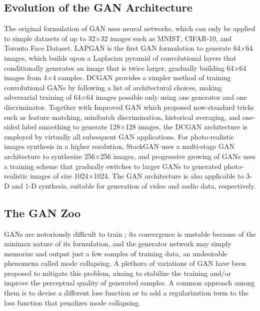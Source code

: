 \subsection{Evolution of the GAN Architecture}

The original formulation of GAN uses neural networks, which can only be applied to simple datasets of up to 32$\times$32 images such as MNIST, CIFAR-10, and Toronto Face Dataset.
LAPGAN \cite{denton2015lapgan} is the first GAN formulation to generate 64$\times$64 images, which builds upon a Laplacian pyramid of convolutional layers that conditionally generates an image that is twice larger, gradually building 64$\times$64 images from 4$\times$4 samples.
DCGAN \cite{radford2015dcgan} provides a simpler method of training convolutional GANs by following a list of architectural choices, making adversarial training of 64$\times$64 images possible only using one generator and one discriminator.
Together with Improved GAN \cite{salimans2016improved} which proposed now-standard tricks such as feature matching, minibatch discrimination, historical averaging, and one-sided label smoothing to generate 128$\times$128 images, the DCGAN architecture is employed by virtually all subsequent GAN applications.
For photo-realistic images synthesis in a higher resolution, StackGAN \cite{zhang2017stackgan2} uses a multi-stage GAN architecture to synthesize 256$\times$256 images, and progressive growing of GANs \cite{karras2017pggan} uses a training scheme that gradually switches to larger GANs to generated photo-realistic images of size 1024$\times$1024.
The GAN architecture is also applicable to 3-D \cite{wu2016gan} and 1-D \cite{donahue2018wavegan} synthesis, suitable for generation of video and audio data, respectively.


\subsection{The GAN Zoo}

GANs are notoriously difficult to train \cite{arjovsky2017principled}; its convergence is unstable because of the minimax nature of its formulation, and the generator network may simply memorize and output just a few samples of training data, an undesirable phenomena called mode collapsing.
A plethora of variations of GAN have been proposed to mitigate this problem, aiming to stabilize the training and/or improve the perceptual quality of generated samples.
A common approach among them is to devise a different loss function or to add a regularization term to the loss function that penalizes mode collapsing.

